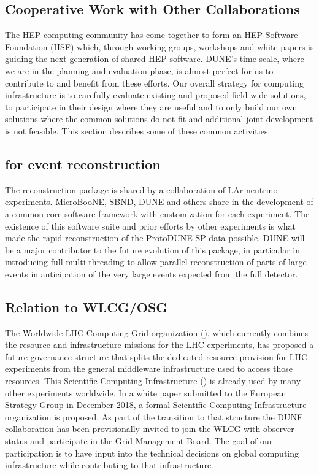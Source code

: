   \subsection{Cooperative Work with Other Collaborations}
  \label{ch:exec-comp-gov-coop}

  The HEP computing community has come together to form an HEP Software Foundation (HSF) which, through working groups, workshops and white-papers is guiding the next generation of shared HEP software.  DUNE's time-scale, where we are in the planning and evaluation phase, is almost perfect for us to contribute to and benefit from these efforts.  Our overall strategy for computing infrastructure is to carefully evaluate existing and proposed field-wide solutions, to participate in their design where they are useful and to only build our own solutions where the common solutions do not fit and additional joint development is not feasible.   This section describes some of these common activities.



  \subsection{ for event reconstruction}

  The   reconstruction package is shared by a collaboration of LAr neutrino experiments.  MicroBooNE, SBND, DUNE and others share in the development of a common core software framework with customization for each experiment. The existence of this software suite and prior efforts by other experiments is what made the rapid reconstruction of the ProtoDUNE-SP data possible.  DUNE will be a major contributor to  the future evolution of this package, in particular in introducing full multi-threading to allow parallel reconstruction of parts of large events in anticipation of the very large events expected from the full detector.



  \subsection{Relation to WLCG/OSG}
  The Worldwide LHC Computing Grid organization (), which currently combines the resource and infrastructure missions for the LHC experiments, has proposed a future governance structure that splits the dedicated resource provision for LHC experiments from the general middleware infrastructure used to access those resources.  This Scientific Computing Infrastructure () is already used by many other experiments worldwide.  In a white paper submitted to the European Strategy Group in December 2018, a formal Scientific Computing Infrastructure organization is proposed. As part of the transition to that structure the DUNE collaboration has been provisionally invited to join the WLCG with observer status and participate in the Grid Management Board. The goal of our participation is to have input into the technical decisions on global computing infrastructure while contributing to that infrastructure.

